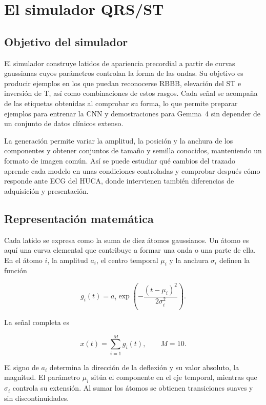 \chapter{El simulador QRS/ST}
\label{chap:simulador}

\section{Objetivo del simulador}

El simulador construye latidos de apariencia precordial a partir de curvas gaussianas cuyos parámetros controlan la forma de las ondas. Su objetivo es producir ejemplos en los que puedan reconocerse RBBB, elevación del ST e inversión de T, así como combinaciones de estos rasgos. Cada señal se acompaña de las etiquetas obtenidas al comprobar su forma, lo que permite preparar ejemplos para entrenar la CNN y demostraciones para Gemma~4 sin depender de un conjunto de datos clínicos extenso.

La generación permite variar la amplitud, la posición y la anchura de los componentes y obtener conjuntos de tamaño y semilla conocidos, manteniendo un formato de imagen común. Así se puede estudiar qué cambios del trazado aprende cada modelo en unas condiciones controladas y comprobar después cómo responde ante ECG del HUCA, donde intervienen también diferencias de adquisición y presentación.

\section{Representación matemática}

Cada latido se expresa como la suma de diez átomos gaussianos. Un átomo es aquí una curva elemental que contribuye a formar una onda o una parte de ella. En el átomo \(i\), la amplitud \(a_i\), el centro temporal \(\mu_i\) y la anchura \(\sigma_i\) definen la función

\begin{equation}
g_i(t) =
a_i
\exp
\left(
-\frac{(t-\mu_i)^2}{2\sigma_i^2}
\right).
\label{eq:gaussian_atom_sim}
\end{equation}
\label{eq:gaussian_atom}

La señal completa es

\begin{equation}
x(t) =
\sum_{i=1}^{M} g_i(t), \qquad M=10.
\label{eq:sum_gaussians}
\end{equation}
\label{eq:gaussian_sum}

El signo de \(a_i\) determina la dirección de la deflexión y su valor absoluto, la magnitud. El parámetro \(\mu_i\) sitúa el componente en el eje temporal, mientras que \(\sigma_i\) controla su extensión. Al sumar los átomos se obtienen transiciones suaves y sin discontinuidades.

